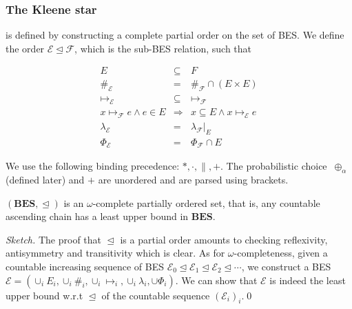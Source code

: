 \documentclass{llncs}
\newcommand{\BES}{\mathbf{BES}}
\newcommand{\EE}{\mathcal{E}}
\newcommand{\FF}{\mathcal{F}}
\newcommand{\prefix}{\trianglelefteq}
\newcommand{\<}{\langle}
\renewcommand{\>}{\rangle}
\newcommand{\pc}[1]{{\ \oplus_{\!#1}\ }}
\newcommand{\exit}{\Phi}
\begin{document}
\subsubsection{The Kleene star} is defined by constructing a complete partial order on the set of BES. We define the order $\EE\prefix\FF$, which is the sub-BES relation, such that 

\begin{eqnarray}
E&\subseteq& F\label{eq:event-inclusion}\nonumber\\
\#_\EE& = &\#_\FF\cap (E\times E)\label{eq:conflic-restriction}\nonumber\\
\mapsto_\EE& \subseteq &\mapsto_\FF\label{eq:bundle-inclusion}\nonumber\\
x\mapsto_\FF e\wedge e\in E&\Rightarrow &x\subseteq E\wedge x\mapsto_\EE e\label{eq:bundle-restriction}\nonumber\\
\lambda_\EE & = &\lambda_\FF|_{E}\nonumber\label{eq:label-restriction}\\
\exit_\EE & = &\exit_\FF\cap E\nonumber\label{eq:final-restriction}
\end{eqnarray}

We use the following binding precedence: $* , \cdot , \|, +$. The probabilistic choice $\!\pc{\alpha}\!$ (defined later) and $+$ are unordered and are parsed using brackets.


\begin{proposition}\label{pro:omega-completeness}
$(\BES,\prefix)$ is an $\omega$-complete partially ordered set, that is, any countable ascending chain has a least upper bound in $\BES$.
\end{proposition}

\begin{proof}[Sketch]
The proof that $\prefix$ is a partial order amounts to checking reflexivity, antisymmetry and transitivity which is clear. As for $\omega$-completeness, given a countable increasing sequence of BES $\EE_0\prefix\EE_1\prefix\EE_2\prefix\cdots$, we construct a BES $\EE = (\cup_i E_i,\cup_i\#_i,\cup_i\mapsto_i,\cup_i\lambda_i,\cup\exit_i)$. We can show that $\EE$ is indeed the least upper bound w.r.t $\prefix$ of the countable sequence $(\EE_i)_i$.\qed
\end{proof}
\end{document}
